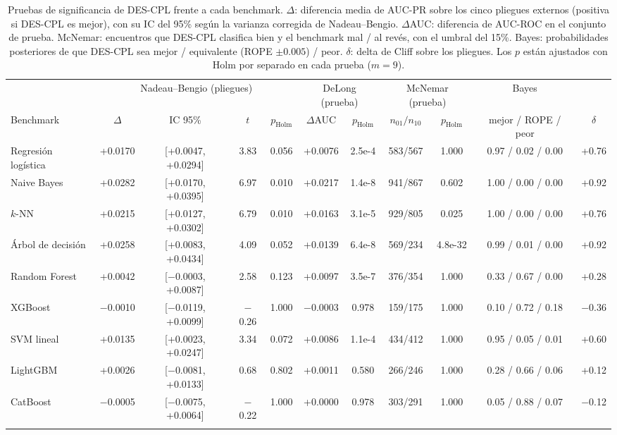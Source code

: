 \documentclass[pdflatex,sn-mathphys-num]{sn-jnl}
\theoremstyle{plain}
\begin{document}
\begin{table}
\caption{Pruebas de significancia de DES-CPL frente a cada benchmark. $\Delta$: diferencia media de AUC-PR sobre los cinco pliegues externos (positiva si DES-CPL es mejor), con su IC del 95\% según la varianza corregida de Nadeau--Bengio. $\Delta$AUC: diferencia de AUC-ROC en el conjunto de prueba. McNemar: encuentros que DES-CPL clasifica bien y el benchmark mal / al revés, con el umbral del 15\%. Bayes: probabilidades posteriores de que DES-CPL sea mejor / equivalente (ROPE $\pm 0.005$) / peor. $\delta$: delta de Cliff sobre los pliegues. Los $p$ están ajustados con Holm por separado en cada prueba ($m = 9$).}\label{tab:pruebas}
\footnotesize
\begin{tabular*}{\textheight}{@{\extracolsep\fill}lcccccccccc@{}}
\toprule
 & \multicolumn{4}{c}{Nadeau--Bengio (pliegues)} & \multicolumn{2}{c}{DeLong (prueba)} & \multicolumn{2}{c}{McNemar (prueba)} & Bayes & \\
\cmidrule(lr){2-5}\cmidrule(lr){6-7}\cmidrule(lr){8-9}
Benchmark & $\Delta$ & IC 95\% & $t$ & $p_{\text{Holm}}$ & $\Delta$AUC & $p_{\text{Holm}}$ & $n_{01}/n_{10}$ & $p_{\text{Holm}}$ & mejor / ROPE / peor & $\delta$ \\
\midrule
Regresión logística & +0.0170 & [+0.0047, +0.0294] & 3.83 & 0.056 & +0.0076 & 2.5e-4 & 583/567 & 1.000 & 0.97 / 0.02 / 0.00 & +0.76 \\
Naive Bayes & +0.0282 & [+0.0170, +0.0395] & 6.97 & 0.010 & +0.0217 & 1.4e-8 & 941/867 & 0.602 & 1.00 / 0.00 / 0.00 & +0.92 \\
$k$-NN & +0.0215 & [+0.0127, +0.0302] & 6.79 & 0.010 & +0.0163 & 3.1e-5 & 929/805 & 0.025 & 1.00 / 0.00 / 0.00 & +0.76 \\
Árbol de decisión & +0.0258 & [+0.0083, +0.0434] & 4.09 & 0.052 & +0.0139 & 6.4e-8 & 569/234 & 4.8e-32 & 0.99 / 0.01 / 0.00 & +0.92 \\
Random Forest & +0.0042 & [$-$0.0003, +0.0087] & 2.58 & 0.123 & +0.0097 & 3.5e-7 & 376/354 & 1.000 & 0.33 / 0.67 / 0.00 & +0.28 \\
XGBoost & $-$0.0010 & [$-$0.0119, +0.0099] & $-$0.26 & 1.000 & $-$0.0003 & 0.978 & 159/175 & 1.000 & 0.10 / 0.72 / 0.18 & $-$0.36 \\
SVM lineal & +0.0135 & [+0.0023, +0.0247] & 3.34 & 0.072 & +0.0086 & 1.1e-4 & 434/412 & 1.000 & 0.95 / 0.05 / 0.01 & +0.60 \\
LightGBM & +0.0026 & [$-$0.0081, +0.0133] & 0.68 & 0.802 & +0.0011 & 0.580 & 266/246 & 1.000 & 0.28 / 0.66 / 0.06 & +0.12 \\
CatBoost & $-$0.0005 & [$-$0.0075, +0.0064] & $-$0.22 & 1.000 & +0.0000 & 0.978 & 303/291 & 1.000 & 0.05 / 0.88 / 0.07 & $-$0.12 \\
\botrule
\end{tabular*}
\end{table}
\end{document}
